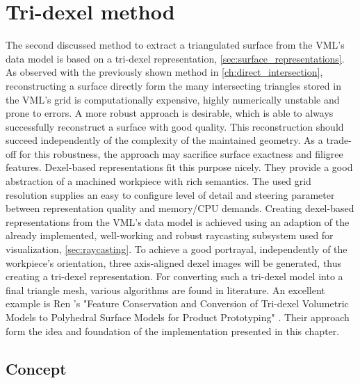 
\chapter{Tri-dexel method}
\label{ch:tri_dexel}

The second discussed method to extract a triangulated surface from the VML's data model is based on a tri-dexel representation, \cf \cref{sec:surface_representations}.
As observed with the previously shown method in \cref{ch:direct_intersection}, reconstructing a surface directly form the many intersecting triangles stored in the VML's grid is computationally expensive, highly numerically unstable and prone to errors.
A more robust approach is desirable, which is able to always successfully reconstruct a surface with good quality.
This reconstruction should succeed independently of the complexity of the maintained geometry.
As a trade-off for this robustness, the approach may sacrifice surface exactness and filigree features.
Dexel-based representations fit this purpose nicely.
They provide a good abstraction of a machined workpiece with rich semantics.
The used grid resolution supplies an easy to configure level of detail and steering parameter between representation quality and memory/CPU demands.
Creating dexel-based representations from the VML's data model is achieved using an adaption of the already implemented, well-working and robust raycasting subsystem used for visualization, \cf \cref{sec:raycasting}.
To achieve a good portrayal, independently of the workpiece's orientation, three axis-aligned dexel images will be generated, thus creating a tri-dexel representation.
For converting such a tri-dexel model into a final triangle mesh, various algorithms are found in literature.
An excellent example is Ren \etal's "Feature Conservation and Conversion of Tri-dexel Volumetric Models to Polyhedral Surface Models for Product Prototyping" \cite{tridexel_reconstruction}.
Their approach form the idea and foundation of the implementation presented in this chapter.


\section{Concept}
\label{sec:tri_dexel_concept}


